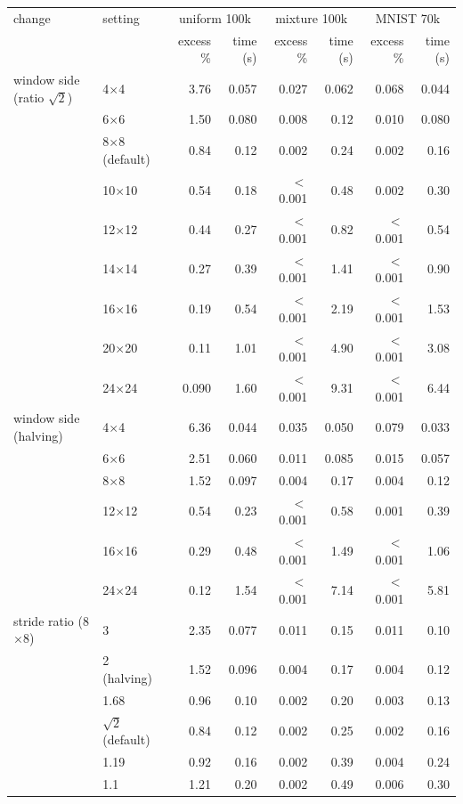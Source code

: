 \begin{tabular}{llrrrrrr}
\toprule
change & setting & \multicolumn{2}{c}{uniform 100k} & \multicolumn{2}{c}{mixture 100k} & \multicolumn{2}{c}{MNIST 70k} \\
 & & excess \% & time (s) & excess \% & time (s) & excess \% & time (s) \\
\midrule
window side (ratio $\sqrt2$) & 4$\times$4 & 3.76 & 0.057 & 0.027 & 0.062 & 0.068 & 0.044 \\
 & 6$\times$6 & 1.50 & 0.080 & 0.008 & 0.12 & 0.010 & 0.080 \\
 & 8$\times$8 (default) & 0.84 & 0.12 & 0.002 & 0.24 & 0.002 & 0.16 \\
 & 10$\times$10 & 0.54 & 0.18 & $<$0.001 & 0.48 & 0.002 & 0.30 \\
 & 12$\times$12 & 0.44 & 0.27 & $<$0.001 & 0.82 & $<$0.001 & 0.54 \\
 & 14$\times$14 & 0.27 & 0.39 & $<$0.001 & 1.41 & $<$0.001 & 0.90 \\
 & 16$\times$16 & 0.19 & 0.54 & $<$0.001 & 2.19 & $<$0.001 & 1.53 \\
 & 20$\times$20 & 0.11 & 1.01 & $<$0.001 & 4.90 & $<$0.001 & 3.08 \\
 & 24$\times$24 & 0.090 & 1.60 & $<$0.001 & 9.31 & $<$0.001 & 6.44 \\
\addlinespace
window side (halving) & 4$\times$4 & 6.36 & 0.044 & 0.035 & 0.050 & 0.079 & 0.033 \\
 & 6$\times$6 & 2.51 & 0.060 & 0.011 & 0.085 & 0.015 & 0.057 \\
 & 8$\times$8 & 1.52 & 0.097 & 0.004 & 0.17 & 0.004 & 0.12 \\
 & 12$\times$12 & 0.54 & 0.23 & $<$0.001 & 0.58 & 0.001 & 0.39 \\
 & 16$\times$16 & 0.29 & 0.48 & $<$0.001 & 1.49 & $<$0.001 & 1.06 \\
 & 24$\times$24 & 0.12 & 1.54 & $<$0.001 & 7.14 & $<$0.001 & 5.81 \\
\addlinespace
stride ratio (8$\times$8) & 3 & 2.35 & 0.077 & 0.011 & 0.15 & 0.011 & 0.10 \\
 & 2 (halving) & 1.52 & 0.096 & 0.004 & 0.17 & 0.004 & 0.12 \\
 & 1.68 & 0.96 & 0.10 & 0.002 & 0.20 & 0.003 & 0.13 \\
 & $\sqrt2$ (default) & 0.84 & 0.12 & 0.002 & 0.25 & 0.002 & 0.16 \\
 & 1.19 & 0.92 & 0.16 & 0.002 & 0.39 & 0.004 & 0.24 \\
 & 1.1 & 1.21 & 0.20 & 0.002 & 0.49 & 0.006 & 0.30 \\

\end{tabular}

